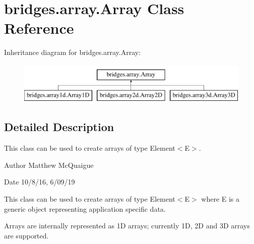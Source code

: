 \hypertarget{classbridges_1_1array_1_1_array}{}\section{bridges.\+array.\+Array Class Reference}
\label{classbridges_1_1array_1_1_array}
Inheritance diagram for bridges.\+array.\+Array\+:\begin{figure}[H]
\begin{center}
\leavevmode
\includegraphics[height=2.000000cm]{classbridges_1_1array_1_1_array}
\end{center}
\end{figure}


\subsection{Detailed Description}
This class can be used to create arrays of type Element$<$\+E$>$. 

\begin{DoxyAuthor}{Author}
Matthew Mc\+Quaigue
\end{DoxyAuthor}
\begin{DoxyDate}{Date}
10/8/16, 6/09/19
\end{DoxyDate}
This class can be used to create arrays of type Element$<$\+E$>$ where E is a generic object representing application specific data.

Arrays are internally represented as 1D arrays; currently 1D, 2D and 3D arrays are supported.


